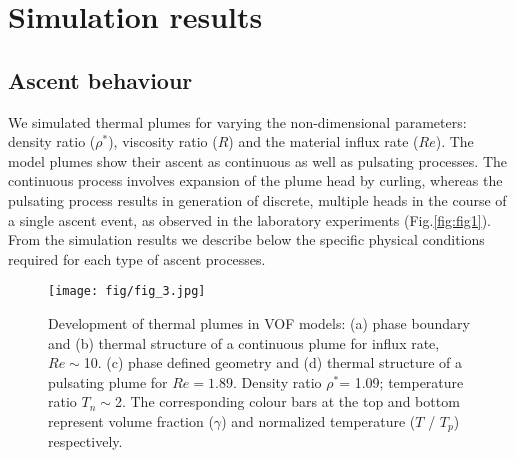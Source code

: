 \documentclass[12pt]{article}
\begin{document}
{\section{Simulation results}
\label{sec:simulation} 
 

\subsection{Ascent behaviour}
\label{sec:ascent} 


We simulated thermal plumes for varying the non-dimensional parameters: density ratio ($\rho^*$), 
viscosity ratio ($R$) and the material influx rate ($Re$). The model plumes show their 
ascent as continuous as well as pulsating processes. The continuous process involves 
expansion of the plume head by curling, whereas the pulsating process results 
in generation of discrete, multiple heads in the course of a single ascent event, as observed in the laboratory experiments (Fig.\ref{fig:fig1}). From the simulation results we describe below the specific physical conditions required for each type of ascent processes. 


\begin{figure}[!htb]
 \begin{center}
{\texttt{[image: fig/fig\_3.jpg]} }
\caption{ \small {Development of thermal plumes in VOF models: 
(a) phase boundary and (b) thermal structure of a continuous plume for
 influx rate, $Re \sim$10.
(c) phase defined geometry and (d) thermal structure of a pulsating plume for 
$Re = 1.89$. Density ratio $\rho^*$= 1.09; temperature ratio $T_n\sim$2. The corresponding colour bars at the top and bottom represent volume fraction ($\gamma$) and normalized temperature ($T$ / $T_p$) respectively.}}
\label{fig:fig3}
 \end{center}
\end{figure}


}
\end{document}
